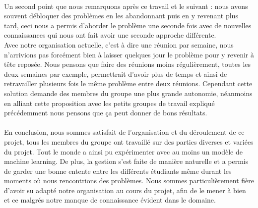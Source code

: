 \paragraph{}
Un second point que nous remarquons après ce travail et le suivant : nous avons souvent débloquer des problèmes en les abandonnant puis en y revenant plus tard, ceci nous a permis d'aborder le problème une seconde fois avec de nouvelles connaissances qui nous ont fait avoir une seconde approche différente.
\\
Avec notre organisation actuelle, c'est à dire une réunion par semaine, nous n'arrivions pas forcément bien à laisser quelques jour le problème pour y revenir à tête reposée. Nous pensons que faire des réunions moins régulièrement, toutes les deux semaines par exemple, permettrait d'avoir plus de temps et ainsi de retravailler plusieurs fois le même problème entre deux réunions. Cependant cette solution demande des membres du groupe une plus grande autonomie, néanmoins en alliant cette proposition avec les petits groupes de travail expliqué précédemment nous pensons que ça peut donner de bons résultats.

\paragraph{} En conclusion, nous sommes satisfait de l'organisation et du déroulement de ce projet, tous les membres du groupe ont travaillé sur des parties diverses et variées du projet. Tout le monde a ainsi pu expérimenter avec au moins un modèle de machine learning. De plus, la gestion s'est faite de manière naturelle et a permis de garder une bonne entente entre les différents étudiants même durant les moments où nous rencontrions des problèmes. Nous sommes particulièrement fière d'avoir su adapté notre organisation au cours du projet, afin de le mener à bien et ce malgrés notre manque de connaissance évident dans le domaine.